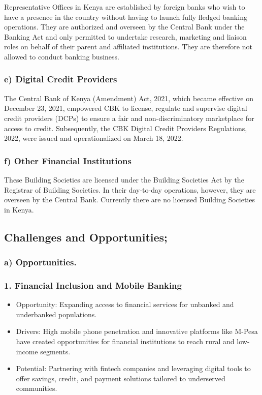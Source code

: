 \documentclass[10pt]{article}
\begin{document}
Representative Offices in Kenya are established by foreign banks who wish to have a presence in the country without having to launch fully fledged banking operations. They are authorized and overseen by the Central Bank under the Banking Act and only permitted to undertake research, marketing and liaison roles on behalf of their parent and affiliated institutions. They are therefore not allowed to conduct banking business.\\
\subsubsection*{e) Digital Credit Providers}

The Central Bank of Kenya (Amendment) Act, 2021, which became effective on December 23, 2021, empowered CBK to license, regulate and supervise digital credit providers (DCPs) to ensure a fair and non-discriminatory marketplace for access to credit. Subsequently, the CBK Digital Credit Providers Regulations, 2022, were issued and operationalized on March 18, 2022.\\
\subsubsection*{f) Other Financial Institutions}

These Building Societies are licensed under the Building Societies Act by the Registrar of Building Societies. In their day-to-day operations, however, they are overseen by the Central Bank. Currently there are no licensed Building Societies in Kenya.

\subsection*{Challenges and Opportunities;}
\subsubsection*{a) Opportunities.}

\subsubsection*{1. Financial Inclusion and Mobile Banking}
\begin{itemize}
  \item Opportunity: Expanding access to financial services for unbanked and underbanked populations.
  \item Drivers: High mobile phone penetration and innovative platforms like M-Pesa have created opportunities for financial institutions to reach rural and low-income segments.
  \item Potential: Partnering with fintech companies and leveraging digital tools to offer savings, credit, and payment solutions tailored to underserved communities.
\end{itemize}
\end{document}
